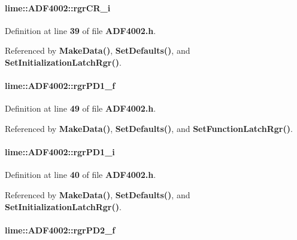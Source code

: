 \paragraph[{rgr\+C\+R\+\_\+i}]{ lime\+::\+A\+D\+F4002\+::rgr\+C\+R\+\_\+i}\label{classlime_1_1ADF4002_af22b712eff4acb81f62f251db2c97b0b}


Definition at line {\bf 39} of file {\bf A\+D\+F4002.\+h}.



Referenced by {\bf Make\+Data()}, {\bf Set\+Defaults()}, and {\bf Set\+Initialization\+Latch\+Rgr()}.

\paragraph[{rgr\+P\+D1\+\_\+f}]{ lime\+::\+A\+D\+F4002\+::rgr\+P\+D1\+\_\+f}\label{classlime_1_1ADF4002_a819404f083f8aef627bae07690a4112c}


Definition at line {\bf 49} of file {\bf A\+D\+F4002.\+h}.



Referenced by {\bf Make\+Data()}, {\bf Set\+Defaults()}, and {\bf Set\+Function\+Latch\+Rgr()}.

\paragraph[{rgr\+P\+D1\+\_\+i}]{ lime\+::\+A\+D\+F4002\+::rgr\+P\+D1\+\_\+i}\label{classlime_1_1ADF4002_a447e7c8482f4f6c27e55aba4c268003b}


Definition at line {\bf 40} of file {\bf A\+D\+F4002.\+h}.



Referenced by {\bf Make\+Data()}, {\bf Set\+Defaults()}, and {\bf Set\+Initialization\+Latch\+Rgr()}.

\paragraph[{rgr\+P\+D2\+\_\+f}]{ lime\+::\+A\+D\+F4002\+::rgr\+P\+D2\+\_\+f}\label{classlime_1_1ADF4002_a51c414f7db0c180c525bd0966922fed9}


